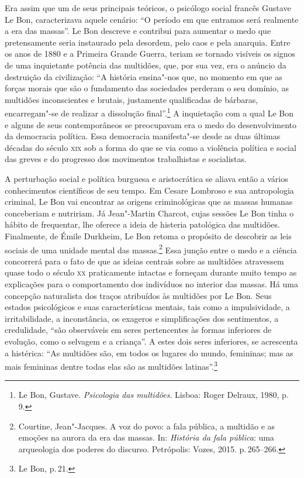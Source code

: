 Era assim que um de seus principais teóricos, o psicólogo social francês
Gustave Le Bon, caracterizava aquele cenário: ``O período em que
entramos será realmente a era das massas''. Le Bon descreve e contribui
para aumentar o medo que pretensamente seria instaurado pela desordem,
pelo caos e pela anarquia. Entre os anos de 1880 e a Primeira Grande
Guerra, teriam se tornado visíveis os signos de uma inquietante potência
das multidões, que, por sua vez, era o anúncio da destruição da
civilização: ``A história ensina"-nos que, no momento em que as forças
morais que são o fundamento das sociedades perderam o seu domínio, as
multidões inconscientes e brutais, justamente qualificadas de bárbaras,
encarregam"-se de realizar a dissolução final''.\footnote{Le Bon, Gustave.
  \emph{Psicologia das multidões}. Lisboa: Roger Delraux, 1980, p.\,9.}
A inquietação com a qual Le Bon e alguns de seus contemporâneos se
preocupavam era o medo do desenvolvimento da democracia política. Essa
democracia manifesta"-se desde as duas últimas décadas do século \textsc{xix} sob
a forma do que se via como a violência política e social das greves e do
progresso dos movimentos trabalhistas e socialistas.

A perturbação social e política burguesa e aristocrática se aliava então
a vários conhecimentos científicos de seu tempo. Em Cesare Lombroso e
sua antropologia criminal, Le Bon vai encontrar as origens
criminológicas que as massas humanas conceberiam e nutririam. Já
Jean"-Martin Charcot, cujas sessões Le Bon tinha o hábito de frequentar,
lhe oferece a ideia de histeria patológica das multidões. Finalmente, de
Émile Durkheim, Le Bon retoma o propósito de descobrir as leis sociais
de uma unidade mental das massas.\footnote{Courtine, Jean"-Jacques. A voz
  do povo: a fala pública, a multidão e as emoções na aurora da era das
  massas. In: \emph{História da fala pública}: uma arqueologia dos
  poderes do discurso. Petrópolis: Vozes, 2015. p.\,265--266.} Essa
junção entre o medo e a ciência concorrerá para o fato de que as ideias
centrais sobre as multidões atravessem quase todo o século \textsc{xx}
praticamente intactas e forneçam durante muito tempo as explicações para
o comportamento dos indivíduos no interior das massas. Há uma concepção
naturalista dos traços atribuídos às multidões por Le Bon. Seus estados
psicológicos e suas características mentais, tais como a impulsividade,
a irritabilidade, a inconstância, os exageros e simplificações dos
sentimentos, a credulidade, ``são observáveis em seres pertencentes às
formas inferiores de evolução, como o selvagem e a criança''. A estes
dois seres inferiores, se acrescenta a histérica: ``As multidões são, em
todos os lugares do mundo, femininas; mas as mais femininas dentre todas
elas são as multidões latinas''.\footnote{Le Bon, p.\,21.}

